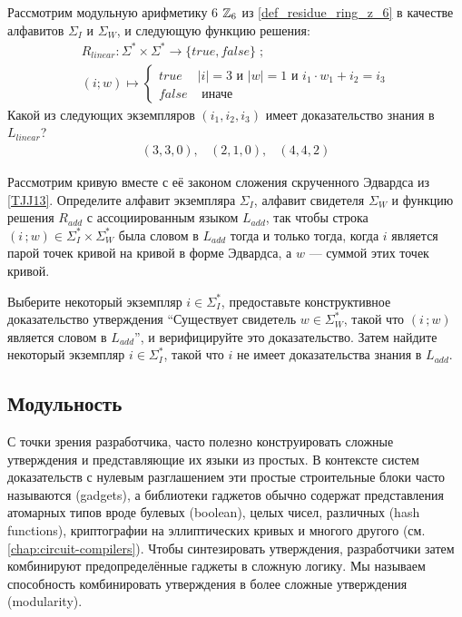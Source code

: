 \begin{exercise} Рассмотрим модульную арифметику 6 $\mathbb{Z}_6$ из \examplename{} \ref{def_residue_ring_z_6} в качестве алфавитов $\Sigma_I$ и $\Sigma_W$, и следующую функцию решения:
\begin{multline*}
R_{linear} : \Sigma^* \times \Sigma^* \to \{true, false\}\;;\\
(i;w) \mapsto
\begin{cases}
true & |i|=3 \text{ и } |w|=1 \text{ и } i_1\cdot w_1 + i_2 = i_3\\
false & \text{ иначе}
\end{cases}
\end{multline*}
Какой из следующих экземпляров $(i_1,i_2,i_3)$ имеет доказательство знания в $L_{linear}$?
$$ 
\begin{array}{ccc}
(3,3,0) , & (2,1,0), & (4,4,2)
\end{array}
$$
\end{exercise}
\begin{exercise}
\label{ex:TJJ-addition-lang} Рассмотрим кривую  вместе с её законом сложения скрученного Эдвардса из \examplename{} \ref{TJJ13}. Определите алфавит экземпляра $\Sigma_I$, алфавит свидетеля $\Sigma_W$ и функцию решения $R_{add}$ с ассоциированным языком $L_{add}$, так чтобы строка $(i\,;w)\in \Sigma_I^* \times \Sigma_W^*$ была словом в $L_{add}$ тогда и только тогда, когда $i$ является парой точек кривой на кривой  в форме Эдвардса, а $w$ — суммой этих точек кривой.

Выберите некоторый экземпляр $i\in \Sigma_I^*$, предоставьте конструктивное доказательство утверждения ``Существует свидетель $w\in \Sigma_W^*$, такой что $(i\,;w)$ является словом в $L_{add}$'', и верифицируйте это доказательство. Затем найдите некоторый экземпляр $i\in \Sigma_I^*$, такой что $i$ не имеет доказательства знания в $L_{add}$.
\end{exercise}

\subsection{Модульность}\label{modularity} 
С точки зрения разработчика, часто полезно конструировать сложные утверждения и представляющие их языки из простых. В контексте систем доказательств с нулевым разглашением эти простые строительные блоки часто называются  (gadgets), а библиотеки гаджетов обычно содержат представления атомарных типов вроде булевых (boolean), целых чисел, различных  (hash functions), криптографии на эллиптических кривых и многого другого (см. \chaptname{} \ref{chap:circuit-compilers}). Чтобы синтезировать утверждения, разработчики затем комбинируют предопределённые гаджеты в сложную логику. Мы называем способность комбинировать утверждения в более сложные утверждения  (modularity).

